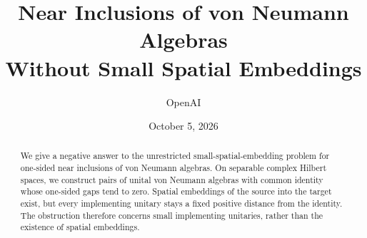 \documentclass[11pt]{article}
\title{Near Inclusions of von Neumann Algebras\\Without Small Spatial Embeddings}
\author{OpenAI}
\date{October 5, 2026}
\theoremstyle{remark}
\numberwithin{equation}{section}
\begin{document}
\maketitle
\begin{abstract}
We give a negative answer to the unrestricted small-spatial-embedding
problem for one-sided near inclusions of von Neumann algebras. On
separable complex Hilbert spaces, we construct pairs of unital von
Neumann algebras with common identity whose one-sided gaps tend to zero.
Spatial embeddings of the source into the target exist, but every
implementing unitary stays a fixed positive distance from the identity.
The obstruction therefore concerns small implementing unitaries, rather
than the existence of spatial embeddings.
\end{abstract}






\end{document}
